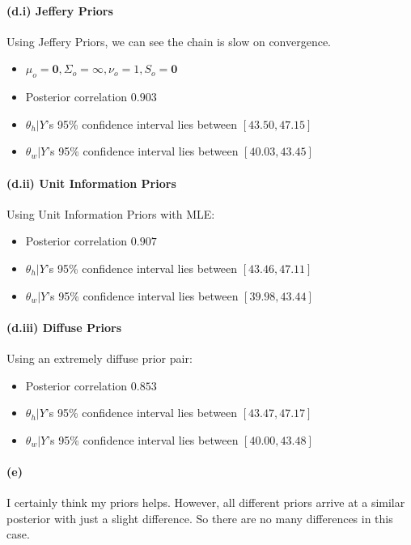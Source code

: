 \documentclass[11pt, letterpaper]{article}
\begin{document}
\paragraph{(d.i) Jeffery Priors}
Using Jeffery Priors, we can see the chain is slow on convergence.
\begin{itemize}
    \item $\mu_o=\mathbf{0}, \Sigma_o=\infty, \nu_o=1, S_o = \mathbf{0}$
    \item Posterior correlation $0.903$
    \item $\theta_h|Y$'s 95\% confidence interval lies between $[43.50, 47.15]$
    \item $\theta_w|Y$'s 95\% confidence interval lies between $[40.03, 43.45]$
\end{itemize}

\paragraph{(d.ii) Unit Information Priors}
Using Unit Information Priors with MLE:
\begin{itemize}
    \item Posterior correlation $0.907$
    \item $\theta_h|Y$'s 95\% confidence interval lies between $[43.46, 47.11]$
    \item $\theta_w|Y$'s 95\% confidence interval lies between $[39.98, 43.44]$
\end{itemize}

\paragraph{(d.iii) Diffuse Priors}
Using an extremely diffuse prior pair:
\begin{itemize}
    \item Posterior correlation $0.853$
    \item $\theta_h|Y$'s 95\% confidence interval lies between $[43.47, 47.17]$
    \item $\theta_w|Y$'s 95\% confidence interval lies between $[40.00, 43.48]$
\end{itemize}

\paragraph{(e)}
I certainly think my priors helps. However, all different priors arrive at a similar posterior with just a slight difference. So there are no many differences in this case.
\end{document}
